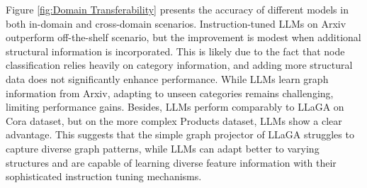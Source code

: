 Figure \ref{fig:Domain Transferability} presents the accuracy of different models in both in-domain and cross-domain scenarios. Instruction-tuned LLMs on Arxiv outperform off-the-shelf scenario, but the improvement is modest when additional structural information is incorporated. This is likely due to the fact that node classification relies heavily on category information, and adding more structural data does not significantly enhance performance. While LLMs learn graph information from Arxiv, adapting to unseen categories remains challenging, limiting performance gains. Besides, LLMs perform comparably to LLaGA on Cora dataset, but on the more complex Products dataset, LLMs show a clear advantage. 
This suggests that the simple graph projector of LLaGA struggles to capture diverse graph patterns, while LLMs can adapt better to varying structures and are capable of learning diverse feature information with their sophisticated instruction tuning mechanisms.

\begin{table}[htbp]
\centering
\caption{LLM domain transferability in link prediction.}
\label{tab:LLM domain transferability}
\end{table}

